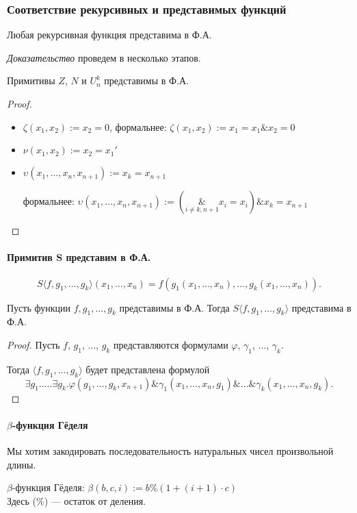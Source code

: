 \subsubsection{Соответствие рекурсивных и представимых функций}
\begin{theorem}Любая рекурсивная функция представима в Ф.А.\end{theorem}
\textit{Доказательство} проведем в несколько этапов.

\begin{theorem}
Примитивы $Z$, $N$ и $U^k_n$ представимы в Ф.А.
\end{theorem}

\begin{proof}
\begin{itemize}
\item $\zeta(x_1,x_2) := x_2=0$,  формальнее: $\zeta(x_1,x_2) := x_1=x_1 \& x_2=0$
\item $\nu(x_1,x_2) := x_2=x_1'$
\item $\upsilon(x_1,\dots,x_n,x_{n+1}) := x_k = x_{n+1}$  \vspace{0.1cm}

формальнее:
     $\upsilon(x_1,\dots,x_n,x_{n+1}) := (\underset{i\ne k,n+1}{\&} x_i=x_i) \& x_k = x_{n+1}$
\end{itemize}
\end{proof}


\paragraph{Примитив S представим в Ф.А.}

\[ S\langle f,g_1,\dots,g_k\rangle(x_1,\dots,x_n) = f(g_1(x_1,\dots,x_n),\dots,g_k(x_1,\dots,x_n)). \]

\begin{theorem}
Пусть функции $f,g_1,\dots,g_k$ представимы в Ф.А. Тогда $S\langle f,g_1,\dots,g_k \rangle$ представима в Ф.А.
\end{theorem}

\begin{proof}
Пусть $f$, $g_1$, ..., $g_k$ представляются формулами $\varphi$, $\gamma_1$, ..., $\gamma_k$.

Тогда
$\langle f,g_1,\dots,g_k\rangle$ будет представлена формулой
\[\exists g_1.\dots.\exists g_k.\varphi(g_1,\dots,g_k,x_{n+1})\&\gamma_1(x_1,\dots,x_n,g_1)\&\dots\&\gamma_k(x_1,\dots,x_n,g_k). \]
\end{proof}

\paragraph{$\beta$-функция Гёделя}
Мы хотим закодировать последовательность натуральных чисел произвольной  длины.
\begin{definition}$\beta$-функция Гёделя: $\mathcal{\beta}(b,c,i) := b \% (1 + (i+1) \cdot c)$\\
Здесь (\%) --- остаток от деления.
\end{definition}

